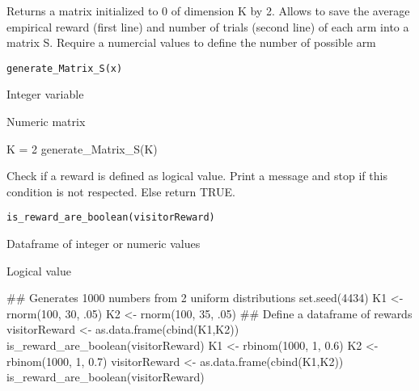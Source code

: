 \documentclass[letterpaper]{book}
\begin{document}
%
\begin{Description}\relax
Returns a matrix initialized to 0 of dimension K by 2.
Allows to save the average empirical reward (first line) and number of trials (second line) of each arm into a matrix S.
Require a numercial values to define the number of possible arm
\end{Description}
%
\begin{Usage}
\begin{verbatim}
generate_Matrix_S(x)
\end{verbatim}
\end{Usage}
%
\begin{Arguments}
\begin{ldescription}
\item[\code{x}] Integer variable
\end{ldescription}
\end{Arguments}
%
\begin{Value}
Numeric matrix
\end{Value}
%
\begin{Examples}
\begin{ExampleCode}
K = 2
generate_Matrix_S(K)

\end{ExampleCode}
\end{Examples}
%
\begin{Description}\relax
Check if a reward is defined as logical value.
Print a message and stop if this condition is not respected.
Else return TRUE.
\end{Description}
%
\begin{Usage}
\begin{verbatim}
is_reward_are_boolean(visitorReward)
\end{verbatim}
\end{Usage}
%
\begin{Arguments}
\begin{ldescription}
\item[\code{visitorReward}] Dataframe of integer or numeric values
\end{ldescription}
\end{Arguments}
%
\begin{Value}
Logical value
\end{Value}
%
\begin{Examples}
\begin{ExampleCode}
## Generates 1000 numbers from 2 uniform distributions
set.seed(4434)
K1 <- rnorm(100, 30, .05)
K2 <- rnorm(100, 35, .05)
## Define a dataframe of rewards
visitorReward <- as.data.frame(cbind(K1,K2))
is_reward_are_boolean(visitorReward)
K1 <- rbinom(1000, 1, 0.6)
K2 <- rbinom(1000, 1, 0.7)
visitorReward <- as.data.frame(cbind(K1,K2))
is_reward_are_boolean(visitorReward)

\end{ExampleCode}
\end{Examples}
\end{document}
